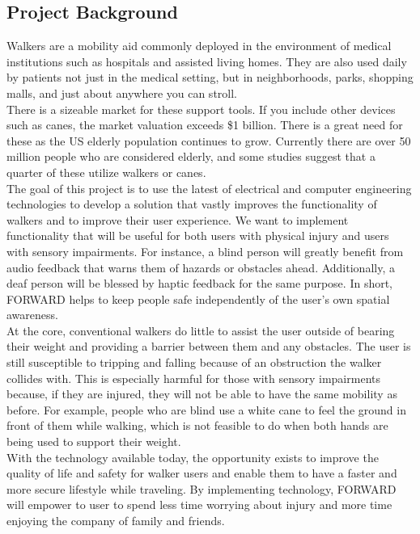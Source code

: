 \subsection{Project Background}
\indent Walkers are a mobility aid commonly deployed in the environment of medical institutions such as hospitals and assisted living homes. They are also used daily by patients not just in the medical setting, but in neighborhoods, parks, shopping malls, and just about anywhere you can stroll. \\

\noindent There is a sizeable market for these support tools. If you include other devices such as canes, the market valuation exceeds \$1 billion. There is a great need for these as the US elderly population continues to grow. Currently there are over 50 million people who are considered elderly, and some studies suggest that a quarter of these utilize walkers or canes. \\

\noindent The goal of this project is to use the latest of electrical and computer engineering technologies to develop a solution that vastly improves the functionality of walkers and to improve their user experience. We want to implement functionality that will be useful for both users with physical injury and users with sensory impairments. For instance, a blind person will greatly benefit from audio feedback that warns them of hazards or obstacles ahead. Additionally, a deaf person will be blessed by haptic feedback for the same purpose. In short, FORWARD helps to keep people safe independently of the user’s own spatial awareness. \\

\noindent At the core, conventional walkers do little to assist the user outside of bearing their weight and providing a barrier between them and any obstacles. The user is still susceptible to tripping and falling because of an obstruction the walker collides with. This is especially harmful for those with sensory impairments because, if they are injured, they will not be able to have the same mobility as before. For example, people who are blind use a white cane to feel the ground in front of them while walking, which is not feasible to do when both hands are being used to support their weight. \\

\noindent With the technology available today, the opportunity exists to improve the quality of life and safety for walker users and enable them to have a faster and more secure lifestyle while traveling. By implementing technology, FORWARD will empower to user to spend less time worrying about injury and more time enjoying the company of family and friends. \\

